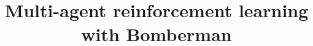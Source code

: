 

\setcounter{secnumdepth}{0}

\title{Multi-agent reinforcement learning with Bomberman}
\date{\vspace{-10ex}}



\maketitle




